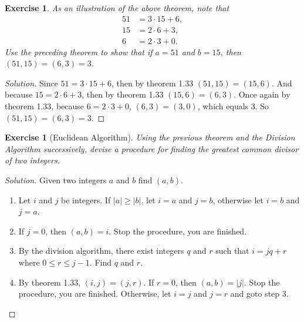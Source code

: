 \documentclass[12pt,leqno]{article}
\numberwithin{equation}{section}
\newtheorem{exer}[thm]{Exercise}
\theoremstyle{definition}
\newcommand{\card}[1]{\left| #1 \right|}
\begin{document}
\begin{exer}
 As an illustration of the above theorem, note that
\begin{align*}
51 & = 3 \cdot 15 + 6, \\
15 & = 2 \cdot 6 + 3, \\
6 & = 2 \cdot 3 + 0.
\end{align*}
Use the preceding theorem to show that if $a = 51$ and $b = 15$,
then $(51, 15) = (6, 3) = 3$.
\end{exer}

\begin{proof}[Solution]
Since $51 = 3 \cdot 15 + 6$, then by theorem 1.33 $(51, 15) = (15, 6)$. And because $15 = 2 \cdot 6 + 3$, then by theorem 1.33 $(15, 6) = (6, 3)$.  Once again by theorem 1.33, because $6 = 2 \cdot 3 + 0$, $(6, 3) = (3, 0)$, which equals $3$.  So $(51, 15) = (6, 3) = 3$.
\end{proof}

\pagebreak
\begin{exer}[Euclidean Algorithm] Using the
previous theorem and the Division Algorithm successively, devise a
procedure for finding the greatest common divisor of two integers.
\end{exer}

\begin{proof}[Solution]
Given two integers $a$ and $b$ find $(a, b)$.
\begin{enumerate}
\item
Let $i$ and $j$ be integers.  If $\card{a} \geq \card{b}$, let $i = a$ and $j = b$, otherwise let $i = b$ and $j = a$.
\item
If $j = 0$, then $(a, b) = i$.  Stop the procedure, you are finished.
\item
By the division algorithm, there exist integers $q$ and $r$ such that $i = jq + r$ where $0 \leq r \leq j-1$.  Find $q$ and $r$.
\item
By theorem 1.33, $(i, j) = (j, r)$.  If $r = 0$, then $(a, b) = \card{j}$.  Stop the procedure, you are finished. Otherwise, let $i = j$ and $j = r$ and goto step 3.

\end{enumerate}
\end{proof}
\end{document}
